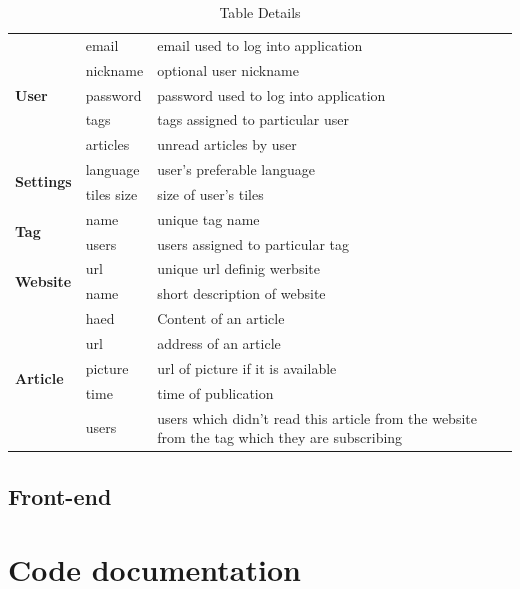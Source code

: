 \documentclass[12pt]{article}
\begin{document}
\begin{table}[H]
\centering
	\begin{tabular}{|p{3cm}|p{3cm}||p{7cm}|} \hline
		\rowcolor{red!20!yellow!30!orange} \multicolumn{3}{|c|}{\textbf{AttomAddict Table Details}} \\ \hline \hline
		\multirow{5}{*}{\textbf{User}} 	 
								&	email	 	& 		email used to log into application		 \\ \cline{2-3}
								&	nickname	& 		optional user nickname						 \\ \cline{2-3}
								&	password	& 		password used to log into application		\\	\cline{2-3}
								& 	tags		&		tags assigned to particular user			\\ 	\cline{2-3}
								&	articles	&		unread articles by user						\\ 	\hline
		\multirow{2}{*}{\textbf{Settings}}
								&	language	&		user's preferable language					\\	\cline{2-3}
								&	tiles size	&		size of user's tiles						\\	\hline
		\multirow{2}{*}{\textbf{Tag}}
								&	name		&		unique tag name								\\ \cline{2-3}
								&	users		&		users assigned to particular tag			\\ \hline
		\multirow{2}{*}{\textbf{Website}}
								&	url			&		unique url definig werbsite					\\	\cline{2-3}
								&	name		&		short description of website				\\ 	\hline
		\multirow{5}{*}{\textbf{Article}}
								&	haed		&		Content of an article						\\	\cline{2-3}
								&	url			&		address of an article						\\	\cline{2-3}
								&	picture		&		url of picture if it is available			\\	\cline{2-3}
								&	time		&		time of publication							\\	\cline{2-3}
								&	users		&		users which didn't read this article from the website from the tag which they are subscribing 			\\ \hline

	\end{tabular}
	\caption{Table Details}
	\label{tab:tableDetails}
\end{table}
\subsection{Front-end}

\section{Code documentation}



\end{document}
